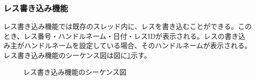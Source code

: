 \documentclass[a4j]{jarticle}
\begin{document}
  \subsubsection{レス書き込み機能}
  レス書き込み機能では既存のスレッド内に、レスを書き込むことができる。このとき、レス番号・ハンドルネーム・日付・レスIDが表示される。レスの書き込み主がハンドルネームを設定している場合、そのハンドルネームが表示される。
  レス書き込み機能のシーケンス図は図に\ref{fig:bbs_res.png}示す。
  \begin{figure}[H]
    \centering
    \caption{レス書き込み機能のシーケンス図}
    \label{fig:bbs_res.png}
  \end{figure}
\end{document}
